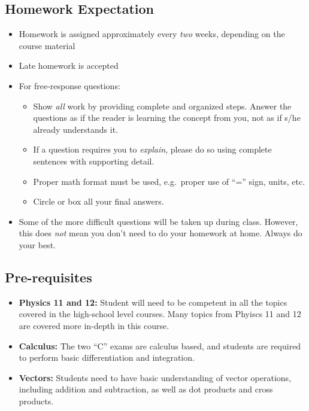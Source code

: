 \documentclass[11pt]{article}
\begin{document}
\subsection{Homework Expectation}
\begin{itemize}[itemsep=0pt,leftmargin=12pt]
\item Homework is assigned approximately every \emph{two} weeks, depending on
  the course material
\item Late homework is accepted
\item For free-response questions:
  \begin{itemize}[noitemsep]
  \item Show \emph{all} work by providing complete and organized steps. Answer
    the questions as if the reader is learning the concept from you, not as if
    s/he already understands it.
  \item If a question requires you to \emph{explain}, please do so using
    complete sentences with supporting detail.
  \item Proper math format must be used, e.g.\ proper use of ``='' sign, units,
    etc.
  \item Circle or box all your final answers.
  \end{itemize}
\item Some of the more difficult questions will be taken up during class.
  However, this does \emph{not} mean you don't need to do your homework at
  home. Always do your best.
\end{itemize}


\subsection*{Pre-requisites}
\begin{itemize}[itemsep=0pt,leftmargin=12pt]
\item\textbf{Physics 11 and 12:} Student will need to be competent in all the
  topics covered in the high-school level courses. Many topics from Phyiscs
  11 and 12 are covered more in-depth in this course.
\item\textbf{Calculus:} The two ``C'' exams are calculus based, and students
  are required to perform basic differentiation and integration.
\item\textbf{Vectors:} Students need to have basic understanding of vector
  operations, including addition and subtraction, as well as dot products and
  cross products.
\end{itemize}
\end{document}
